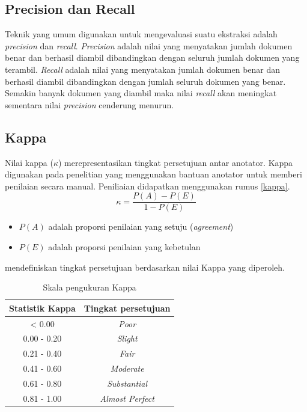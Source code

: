 \subsection{Precision dan Recall}
Teknik yang umum digunakan untuk mengevaluasi suatu ekstraksi adalah \textit{precision} dan \textit{recall}. \textit{Precision} adalah nilai yang menyatakan jumlah dokumen benar dan berhasil diambil dibandingkan dengan seluruh jumlah dokumen yang terambil. \textit{Recall} adalah nilai yang menyatakan jumlah dokumen benar dan berhasil diambil dibandingkan dengan jumlah seluruh dokumen yang benar. Semakin banyak dokumen yang diambil maka nilai \textit{recall} akan meningkat sementara nilai \textit{precision} cenderung menurun. 

\subsection{Kappa}
Nilai kappa ($\kappa$) merepresentasikan tingkat persetujuan antar anotator. Kappa digunakan pada penelitian yang menggunakan bantuan anotator untuk memberi penilaian secara manual. Peniliaian didapatkan menggunakan rumus \ref{kappa}.
\begin{equation}
\label{kappa}
\kappa=\frac{P(A)-P(E)}{1-P(E)}
\end{equation}
\begin{itemize}
  \item $P(A)$ adalah proporsi penilaian yang setuju (\textit{agreement})
  \item $P(E)$ adalah proporsi penilaian yang kebetulan
\end{itemize}

\cite{landis1977measurement} mendefiniskan tingkat persetujuan berdasarkan nilai Kappa yang diperoleh. 
\begin{table}
  \centering
    \caption{Skala pengukuran Kappa}
    \label{table:skalaKappa}
    \begin{tabular}{|c|c|}
      \hline
      Statistik Kappa & Tingkat persetujuan \\ \hline
      < 0.00 & \textit{Poor} \\ \hline
      0.00 - 0.20 & \textit{Slight} \\ \hline
      0.21 - 0.40 & \textit{Fair} \\ \hline
      0.41 - 0.60 & \textit{Moderate} \\ \hline
      0.61 - 0.80 & \textit{Substantial} \\ \hline
      0.81 - 1.00 & \textit{Almost Perfect} \\ \hline
    \end{tabular}
\end{table}

